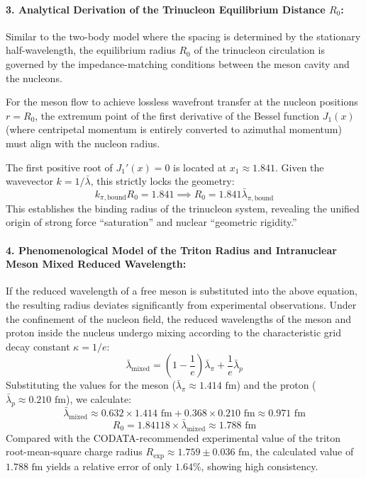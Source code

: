 \documentclass[12pt, a4paper]{article}
\begin{document}
\paragraph{3. Analytical Derivation of the Trinucleon Equilibrium Distance $R_0$:}
Similar to the two-body model where the spacing is determined by the stationary half-wavelength, the equilibrium radius $R_0$ of the trinucleon circulation is governed by the impedance-matching conditions between the meson cavity and the nucleons.

For the meson flow to achieve lossless wavefront transfer at the nucleon positions $r = R_0$, the extremum point of the first derivative of the Bessel function $J_1(x)$ (where centripetal momentum is entirely converted to azimuthal momentum) must align with the nucleon radius.

The first positive root of $J_1'(x) = 0$ is located at $x_1 \approx 1.841$. Given the wavevector $k = 1/\bar{\lambda}$, this strictly locks the geometry:
\begin{equation}
k_{\pi, \mathrm{bound}} R_0 = 1.841 \implies R_0 = 1.841 \bar{\lambda}_{\pi, \mathrm{bound}}
\end{equation}
This establishes the binding radius of the trinucleon system, revealing the unified origin of strong force ``saturation'' and nuclear ``geometric rigidity.''

\paragraph{4. Phenomenological Model of the Triton Radius and Intranuclear Meson Mixed Reduced Wavelength:}
If the reduced wavelength of a free meson is substituted into the above equation, the resulting radius deviates significantly from experimental observations. Under the confinement of the nucleon field, the reduced wavelengths of the meson and proton inside the nucleus undergo mixing according to the characteristic grid decay constant $\kappa = 1/e$:
\begin{equation}
\bar{\lambda}_{\mathrm{mixed}} = \left(1 - \frac{1}{e}\right) \bar{\lambda}_\pi + \frac{1}{e} \bar{\lambda}_p
\end{equation}
Substituting the values for the meson ($\bar{\lambda}_\pi \approx 1.414\text{ fm}$) and the proton ($\bar{\lambda}_p \approx 0.210\text{ fm}$), we calculate:
\begin{equation}
\bar{\lambda}_{\mathrm{mixed}} \approx 0.632 \times 1.414\text{ fm} + 0.368 \times 0.210\text{ fm} \approx 0.971\text{ fm}
\end{equation}
\begin{equation}
R_0 = 1.84118 \times \bar{\lambda}_{\mathrm{mixed}} \approx 1.788\text{ fm}
\end{equation}
Compared with the CODATA-recommended experimental value of the triton root-mean-square charge radius $R_{\mathrm{exp}} \approx 1.759 \pm 0.036\text{ fm}$, the calculated value of $1.788\text{ fm}$ yields a relative error of only \textbf{$1.64\%$}, showing high consistency.
\end{document}
